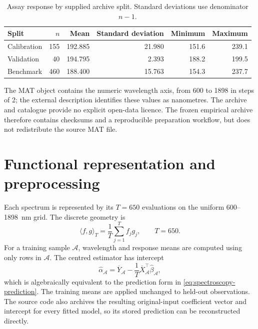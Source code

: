 \begin{table}[htbp]
    \centering
    \small
    \caption[Assay by supplied archive split]{Assay response by supplied archive split.  Standard deviations
    use denominator $n-1$.}
    \label{tab:app-spectroscopy-splits}
    \begin{tabular}{@{}lrrrrr@{}}
        \toprule
        Split & $n$ & Mean & Standard deviation & Minimum & Maximum \\
        \midrule
        Calibration & 155 & 192.885 & 21.980 & 151.6 & 239.1 \\
        Validation  &  40 & 194.795 &  2.393 & 188.2 & 199.5 \\
        Benchmark   & 460 & 188.400 & 15.763 & 154.3 & 237.7 \\
        \bottomrule
    \end{tabular}
\end{table}

The MAT object contains the numeric wavelength axis, from 600 to 1898
in steps of 2; the external description identifies these values as nanometres.  The archive
and catalogue provide no explicit open-data licence.  The frozen empirical
archive therefore contains checksums and a reproducible preparation workflow,
but does not redistribute the source MAT file.

\section{Functional representation and preprocessing}
\label{sec:app-spectroscopy-preprocessing}

Each spectrum is represented by its $T=650$ evaluations on the uniform
600--1898~nm grid.  The discrete geometry is
\begin{equation}
    \langle f,g\rangle_T=\frac{1}{T}\sum_{j=1}^{T} f_jg_j,
    \qquad T=650.
    \label{eq:app-spectroscopy-inner-product}
\end{equation}
For a training sample $\mathcal A$, wavelength and response means are computed
using only rows in $\mathcal A$.  The centred estimator has intercept
\begin{equation}
    \widehat\alpha_{\mathcal A}
      =\overline Y_{\mathcal A}
       -\frac{1}{T}\overline X_{\mathcal A}^{\top}
        \widehat\beta_{\mathcal A},
    \label{eq:app-spectroscopy-intercept}
\end{equation}
which is algebraically equivalent to the prediction form in
\eqref{eq:spectroscopy-prediction}.  The training means are applied unchanged
to held-out observations.  The source code also archives the resulting
original-input coefficient vector and intercept for every fitted model, so its
stored prediction can be reconstructed directly.


